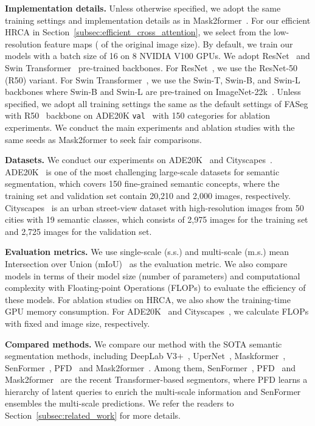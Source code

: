 \noindent\textbf{Implementation details.} Unless otherwise specified, we adopt the same training settings and implementation details as in Mask2former~\cite{cheng2021masked}. For our efficient HRCA in Section~\ref{subsec:efficient_cross_attention}, we select  from the low-resolution feature maps ( of the original image size). By default, we train our models with a batch size of 16 on 8 NVIDIA
V100 GPUs. We adopt ResNet~\cite{he2016deep} and Swin Transformer~\cite{swin} pre-trained backbones. For ResNet~\cite{he2016deep}, we use the ResNet-50 (R50) variant. For Swin Transformer~\cite{swin}, we use the Swin-T, Swin-B, and Swin-L backbones where Swin-B and Swin-L are pre-trained on ImageNet-22k~\cite{deng2009imagenet}. Unless specified, we adopt all training settings the same as the default settings of FASeg with R50~\cite{he2016deep} backbone on ADE20K \texttt{val}~\cite{zhou2017scene} with 150 categories for ablation experiments. We conduct the main experiments and ablation studies with the same seeds as Mask2former to seek fair comparisons.

\noindent\textbf{Datasets.} We conduct our experiments on ADE20K~\cite{zhou2017scene} and Cityscapes~\cite{cordts2016cityscapes}. ADE20K~\cite{zhou2017scene} is one of the most challenging large-scale datasets for semantic segmentation, which covers 150 fine-grained semantic concepts, where the training set and validation set contain 20,210 and 2,000 images, respectively. Cityscapes~\cite{cordts2016cityscapes} is an urban street-view dataset with high-resolution images from 50 cities with 19 semantic classes, which consists of 2,975 images for the training set and 2,725 images for the validation set.

\noindent\textbf{Evaluation metrics. } We use single-scale (s.s.) and multi-scale (m.s.) mean Intersection over Union (mIoU)~\cite{everingham2015pascal} as the evaluation metric. We also compare models in terms of their model size (number of parameters) and computational complexity with Floating-point Operations (FLOPs) to evaluate the efficiency of these models. For ablation studies on HRCA, we also show the training-time GPU memory consumption.
For ADE20K~\cite{zhou2017scene} and Cityscapes~\cite{cordts2016cityscapes}, we calculate FLOPs with fixed  and  image size, respectively.

\noindent\textbf{Compared methods.} We compare our method with the SOTA semantic segmentation methods, including DeepLab V3+~\cite{chen2018encoder}, UperNet~\cite{xiao2018unified}, Maskformer~\cite{cheng2021per}, SenFormer~\cite{bousselham2021efficient}, PFD~\cite{qin2022pyramid} and Mask2former~\cite{cheng2021masked}. Among them, SenFormer~\cite{bousselham2021efficient}, PFD~\cite{qin2022pyramid} and Mask2former~\cite{cheng2021masked} are the recent Transformer-based segmentors, where PFD learns a hierarchy of latent queries to enrich the multi-scale information and SenFormer ensembles the multi-scale predictions. We refer the readers to Section~\ref{subsec:related_work} for more details.

